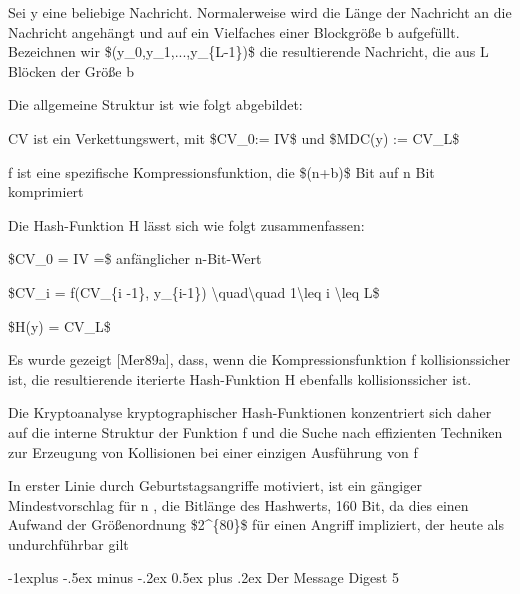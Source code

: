 \documentclass[a4paper]{article}
\makeatletter
\renewcommand{\subsection}{\@startsection{subsection}{2}{0mm}%
 {-1explus -.5ex minus -.2ex}%
 {0.5ex plus .2ex}%
 {\normalfont\normalsize\bfseries}}
\makeatother
\begin{document}
\begin{multicols}{3}
\begin{itemize*}
            \begin{itemize*}
                  \item Sei y eine beliebige Nachricht. Normalerweise wird die Länge der Nachricht an die Nachricht angehängt und auf ein Vielfaches einer Blockgröße b aufgefüllt. Bezeichnen wir \$(y\_0,y\_1,...,y\_\{L-1\})\$ die resultierende Nachricht, die aus L Blöcken der Größe b
                  \item Die allgemeine Struktur ist wie folgt abgebildet: %
                  \item CV ist ein Verkettungswert, mit \$CV\_0:= IV\$ und \$MDC(y) := CV\_L\$
                  \item f ist eine spezifische Kompressionsfunktion, die \$(n+b)\$ Bit auf n Bit komprimiert
            \end{itemize*}
            \item Die Hash-Funktion H lässt sich wie folgt zusammenfassen:
            \begin{itemize*}
                  \item \$CV\_0 = IV =\$ anfänglicher n-Bit-Wert
                  \item \$CV\_i = f(CV\_\{i -1\}, y\_\{i-1\}) \textbackslash quad\textbackslash quad 1\textbackslash leq i \textbackslash leq L\$
                  \item \$H(y) = CV\_L\$
            \end{itemize*}
            \item
            Es wurde gezeigt {[}Mer89a{]}, dass, wenn die Kompressionsfunktion f
            kollisionssicher ist, die resultierende iterierte Hash-Funktion H
            ebenfalls kollisionssicher ist.
            \item
            Die Kryptoanalyse kryptographischer Hash-Funktionen konzentriert sich
            daher auf die interne Struktur der Funktion f und die Suche nach
            effizienten Techniken zur Erzeugung von Kollisionen bei einer einzigen
            Ausführung von f
            \item
            In erster Linie durch Geburtstagsangriffe motiviert, ist ein gängiger
            Mindestvorschlag für n , die Bitlänge des Hashwerts, 160 Bit, da dies
            einen Aufwand der Größenordnung \$2\^{}\{80\}\$ für einen Angriff
            impliziert, der heute als undurchführbar gilt
      \end{itemize*}


      \subsection{Der Message Digest 5}


\end{multicols}
\end{document}
